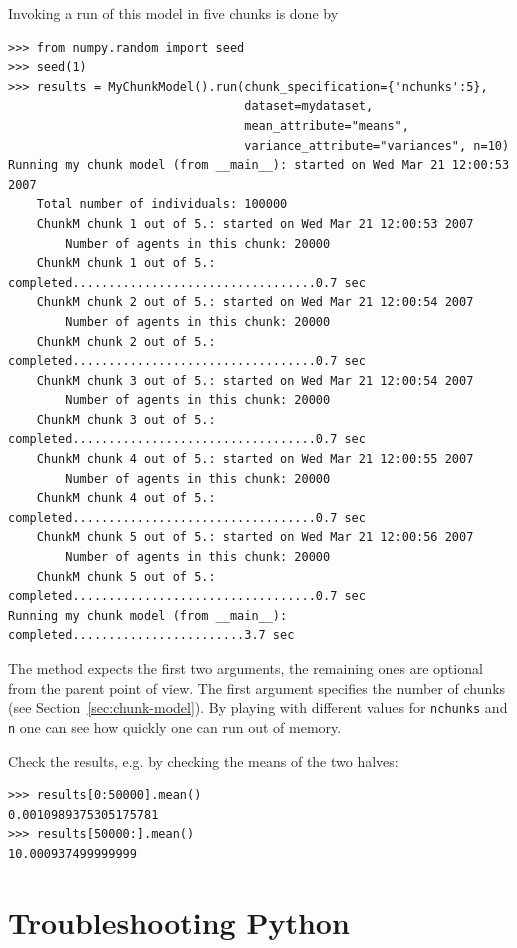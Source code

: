 Invoking a run of this model in five chunks is done by
\attributesindex
\begin{verbatim}
>>> from numpy.random import seed
>>> seed(1)
>>> results = MyChunkModel().run(chunk_specification={'nchunks':5},
                                 dataset=mydataset,
                                 mean_attribute="means",
                                 variance_attribute="variances", n=10)
Running my chunk model (from __main__): started on Wed Mar 21 12:00:53 2007
    Total number of individuals: 100000
    ChunkM chunk 1 out of 5.: started on Wed Mar 21 12:00:53 2007
        Number of agents in this chunk: 20000
    ChunkM chunk 1 out of 5.: completed..................................0.7 sec
    ChunkM chunk 2 out of 5.: started on Wed Mar 21 12:00:54 2007
        Number of agents in this chunk: 20000
    ChunkM chunk 2 out of 5.: completed..................................0.7 sec
    ChunkM chunk 3 out of 5.: started on Wed Mar 21 12:00:54 2007
        Number of agents in this chunk: 20000
    ChunkM chunk 3 out of 5.: completed..................................0.7 sec
    ChunkM chunk 4 out of 5.: started on Wed Mar 21 12:00:55 2007
        Number of agents in this chunk: 20000
    ChunkM chunk 4 out of 5.: completed..................................0.7 sec
    ChunkM chunk 5 out of 5.: started on Wed Mar 21 12:00:56 2007
        Number of agents in this chunk: 20000
    ChunkM chunk 5 out of 5.: completed..................................0.7 sec
Running my chunk model (from __main__): completed........................3.7 sec
\end{verbatim}
The  method expects the first two arguments, the remaining ones are optional
from the parent point of view. The first argument specifies the number of chunks (see
Section~\ref{sec:chunk-model}). By playing with different values for \verb|nchunks| and
\verb|n| one can see how quickly one can run out of memory. 

Check the results, e.g. by checking the means of the two halves:
\begin{verbatim}
>>> results[0:50000].mean()
0.0010989375305175781
>>> results[50000:].mean()
10.000937499999999
\end{verbatim}

\section{Troubleshooting Python}
\label{sec:troubleshooting-python}

